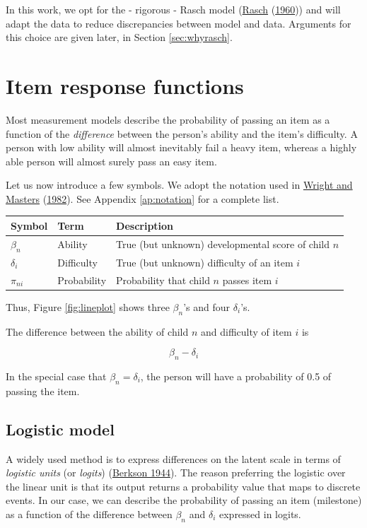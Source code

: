 \documentclass[
]{book}
\begin{document}
In this work, we opt for the - rigorous - Rasch model (\protect\hyperlink{ref-rasch1960}{Rasch} (\protect\hyperlink{ref-rasch1960}{1960})) and will adapt the data to reduce discrepancies between model and data. Arguments for this choice are given later, in Section \ref{sec:whyrasch}.

\hypertarget{sec:itemresponsefunctions}{%
\section{Item response functions}\label{sec:itemresponsefunctions}}

Most measurement models describe the probability of passing an item as a function of the \emph{difference} between the person's ability and the item's difficulty. A person with low ability will almost inevitably fail a heavy item, whereas a highly able person will almost surely pass an easy item.

Let us now introduce a few symbols. We adopt the notation used in \protect\hyperlink{ref-wright1982}{Wright and Masters} (\protect\hyperlink{ref-wright1982}{1982}). See Appendix \ref{ap:notation} for a complete list.

\begin{longtable}[]{@{}lll@{}}
\toprule
Symbol & Term & Description\tabularnewline
\midrule
\endhead
\(\beta_n\) & Ability & True (but unknown) developmental score of child \(n\)\tabularnewline
\(\delta_i\) & Difficulty & True (but unknown) difficulty of an item \(i\)\tabularnewline
\(\pi_{ni}\) & Probability & Probability that child \(n\) passes item \(i\)\tabularnewline
\bottomrule
\end{longtable}

Thus, Figure \ref{fig:lineplot} shows three \(\beta_n\)'s and four \(\delta_i\)'s.

The difference between the ability of child \(n\) and difficulty of item \(i\) is

\[\beta_n - \delta_i\]

In the special case that \(\beta_n = \delta_i\), the person will have a probability of 0.5 of passing the item.

\hypertarget{logistic-model}{%
\subsection{Logistic model}\label{logistic-model}}

A widely used method is to express differences on the latent scale in terms of \emph{logistic units} (or \emph{logits}) (\protect\hyperlink{ref-berkson1944}{Berkson 1944}). The reason preferring the logistic over the linear unit is that its output returns a probability value that maps to discrete events. In our case, we can describe the probability of passing an item (milestone) as a function of the difference between \(\beta_n\) and \(\delta_i\) expressed in logits.
\end{document}

